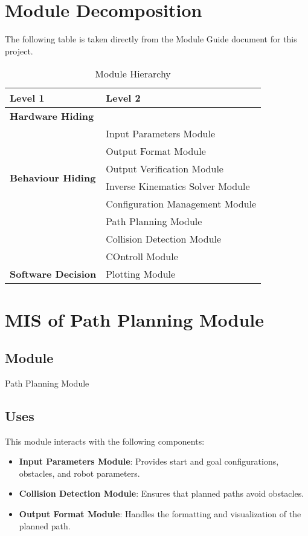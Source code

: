 \documentclass[12pt, titlepage]{article}
\begin{document}
\section{Module Decomposition}

The following table is taken directly from the Module Guide document for this project.


\begin{table}[h!]
  \centering
  \begin{tabular}{p{} p{}}
  \toprule
  \textbf{Level 1} & \textbf{Level 2}\\
  \midrule
  \textbf{Hardware Hiding} & \\ 
  \midrule
  \multirow{6}{0.3\textwidth}{\textbf{Behaviour Hiding}} 
  & Input Parameters Module \\ 
  & Output Format Module \\ 
  & Output Verification Module \\ 
  & Inverse Kinematics Solver Module \\ 
  & Configuration Management Module \\ 
  & Path Planning Module \\ 
  & Collision Detection Module \\ 
  & COntroll Module\\
  \midrule
  \multirow{1}{0.3\textwidth}{\textbf{Software Decision}} 
  & Plotting Module \\ 
  \bottomrule
  \end{tabular}
  \caption{Module Hierarchy}
  \label{TblMH}
\end{table}


\newpage

\section{MIS of Path Planning Module} \label{Module:PathPlanning}

\subsection{Module}
Path Planning Module

\subsection{Uses}
This module interacts with the following components:
\begin{itemize}
\item \textbf{Input Parameters Module}: Provides start and goal configurations, obstacles, and robot parameters.
\item \textbf{Collision Detection Module}: Ensures that planned paths avoid obstacles.
\item \textbf{Output Format Module}: Handles the formatting and visualization of the planned path.
\end{itemize}
\end{document}
